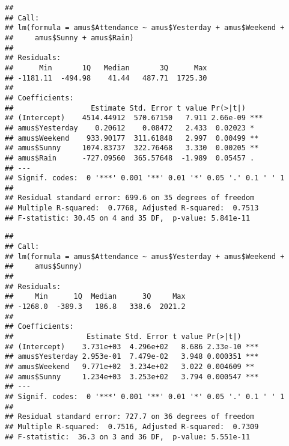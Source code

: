 \documentclass[]{article}
\newenvironment{Shaded}{\begin{snugshade}}{\end{snugshade}}
\newcommand{\KeywordTok}[1]{\textcolor[rgb]{0.13,0.29,0.53}{\textbf{#1}}}
\newcommand{\NormalTok}[1]{#1}
\newcommand{\OperatorTok}[1]{\textcolor[rgb]{0.81,0.36,0.00}{\textbf{#1}}}
\newcommand{\StringTok}[1]{\textcolor[rgb]{0.31,0.60,0.02}{#1}}
\begin{document}
\begin{verbatim}
## 
## Call:
## lm(formula = amus$Attendance ~ amus$Yesterday + amus$Weekend + 
##     amus$Sunny + amus$Rain)
## 
## Residuals:
##      Min       1Q   Median       3Q      Max 
## -1181.11  -494.98    41.44   487.71  1725.30 
## 
## Coefficients:
##                  Estimate Std. Error t value Pr(>|t|)    
## (Intercept)    4514.44912  570.67150   7.911 2.66e-09 ***
## amus$Yesterday    0.20612    0.08472   2.433  0.02023 *  
## amus$Weekend    933.90177  311.61848   2.997  0.00499 ** 
## amus$Sunny     1074.83737  322.76468   3.330  0.00205 ** 
## amus$Rain      -727.09560  365.57648  -1.989  0.05457 .  
## ---
## Signif. codes:  0 '***' 0.001 '**' 0.01 '*' 0.05 '.' 0.1 ' ' 1
## 
## Residual standard error: 699.6 on 35 degrees of freedom
## Multiple R-squared:  0.7768, Adjusted R-squared:  0.7513 
## F-statistic: 30.45 on 4 and 35 DF,  p-value: 5.841e-11
\end{verbatim}

\begin{Shaded}
\end{Shaded}

\begin{verbatim}
## 
## Call:
## lm(formula = amus$Attendance ~ amus$Yesterday + amus$Weekend + 
##     amus$Sunny)
## 
## Residuals:
##     Min      1Q  Median      3Q     Max 
## -1268.0  -389.3   186.8   338.6  2021.2 
## 
## Coefficients:
##                 Estimate Std. Error t value Pr(>|t|)    
## (Intercept)    3.731e+03  4.296e+02   8.686 2.33e-10 ***
## amus$Yesterday 2.953e-01  7.479e-02   3.948 0.000351 ***
## amus$Weekend   9.771e+02  3.234e+02   3.022 0.004609 ** 
## amus$Sunny     1.234e+03  3.253e+02   3.794 0.000547 ***
## ---
## Signif. codes:  0 '***' 0.001 '**' 0.01 '*' 0.05 '.' 0.1 ' ' 1
## 
## Residual standard error: 727.7 on 36 degrees of freedom
## Multiple R-squared:  0.7516, Adjusted R-squared:  0.7309 
## F-statistic:  36.3 on 3 and 36 DF,  p-value: 5.551e-11
\end{verbatim}
\end{document}

